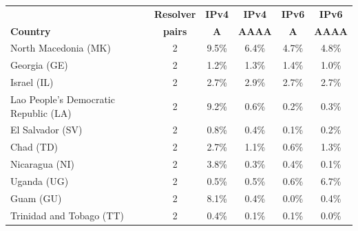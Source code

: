 {\begin{table}[ht]
{\begin{tabular}{lccccc}
                \bottomrule
        \end{tabular}

        \begin{tabular}{lccccc}
            \toprule
                \textbf{} & \textbf{Resolver} & \textbf{IPv4} & \textbf{IPv4} & \textbf{IPv6} & \textbf{IPv6} \\
                \textbf{Country} & \textbf{pairs} & \textbf{A} & \textbf{AAAA} & \textbf{A} & \textbf{AAAA} \\
                \midrule

North Macedonia (MK)  &     2  & \cellcolor{red0} 9.5\% & 6.4\% & 4.7\% & 4.8\% \\  %
Georgia (GE)          &     2  & 1.2\% & 1.3\% & 1.4\% & 1.0\% \\  %
Israel (IL)           &     2  & 2.7\% & 2.9\% & 2.7\% & 2.7\% \\  %
Lao People's Democratic Republic (LA)  &     2  & \cellcolor{red5}  9.2\% & \cellcolor{green1} 0.6\% & \cellcolor{green1} 0.2\% & \cellcolor{green1} 0.3\% \\  %
El Salvador (SV)      &     2  & \cellcolor{red5}  0.8\% & 0.4\% & \cellcolor{green2} 0.1\% & \cellcolor{green1} 0.2\% \\  %
Chad (TD)             &     2  & \cellcolor{red1} 2.7\% & 1.1\% & \cellcolor{green0} 0.6\% & 1.3\% \\  %
Nicaragua (NI)        &     2  & \cellcolor{red5}  3.8\% & \cellcolor{green0} 0.3\% & \cellcolor{green0} 0.4\% & \cellcolor{green0} 0.1\% \\  %
Uganda (UG)           &     2  & \cellcolor{green0} 0.5\% & \cellcolor{green0} 0.5\% & \cellcolor{green0} 0.6\% & \cellcolor{red5}  6.7\% \\  %
Guam (GU)             &     2  & \cellcolor{red5}  8.1\% & \cellcolor{green1} 0.4\% & \cellcolor{green1} 0.0\% & \cellcolor{green1} 0.4\% \\  %
Trinidad and Tobago (TT)  &     2  & \cellcolor{red5}  0.4\% & 0.1\% & \cellcolor{green0} 0.1\% & \cellcolor{green2} 0.0\% \\  %

\end{tabular}}
\end{table}}
